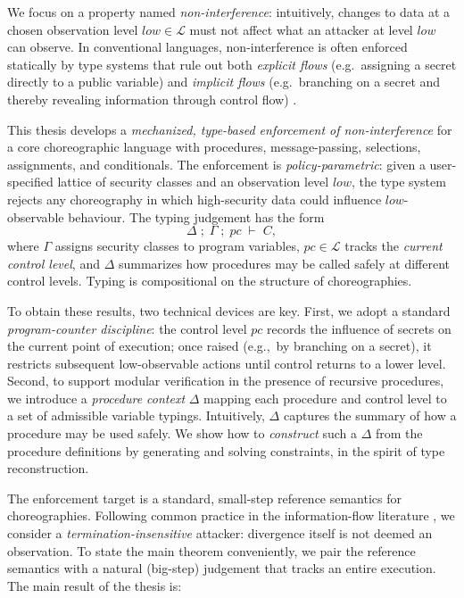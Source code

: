 \documentclass[12pt,a4paper,twoside]{book}
\newcommand{\MCL}{\mathscr{L}}
\begin{document}
We focus on a property named \emph{non-interference}\cite{goguen1982security}: intuitively, changes to data at a chosen observation level \(low \in \MCL\) must not affect what an attacker at level \(low\) can observe. In conventional languages, non-interference is often enforced statically by type systems that rule out both \emph{explicit flows} (e.g.\ assigning a secret directly to a public variable) and \emph{implicit flows} (e.g.\ branching on a secret and thereby revealing information through control flow) \cite{volpano1996sound}.

This thesis develops a \emph{mechanized, type-based enforcement of non-interference} for a core choreographic language with procedures, message-passing, selections, assignments, and conditionals. The enforcement is \emph{policy-parametric}: given a user-specified lattice of security classes and an observation level \(low\), the type system rejects any choreography in which high-security data could influence \(low\)-observable behaviour. The typing judgement has the form
\[
  \Delta \;;\; \Gamma \;;\; pc \;\vdash\; C,
\]
where $\Gamma$ assigns security classes to program variables, $pc \in \MCL$ tracks the \emph{current control level}, and $\Delta$ summarizes how procedures may be called safely at different control levels. Typing is compositional on the structure of choreographies.

To obtain these results, two technical devices are key. First, we adopt a standard \emph{program-counter discipline}: the control level $pc$ records the influence of secrets on the current point of execution; once raised (e.g.,\ by branching on a secret), it restricts subsequent low-observable actions until control returns to a lower level. Second, to support modular verification in the presence of recursive procedures, we introduce a \emph{procedure context} $\Delta$ mapping each procedure and control level to a set of admissible variable typings. Intuitively, $\Delta$ captures the summary of how a procedure may be used safely. We show how to \emph{construct} such a $\Delta$ from the procedure definitions by generating and solving constraints, in the spirit of type reconstruction\cite{pierce2002types}.

The enforcement target is a standard, small-step reference semantics for choreographies. Following common practice in the information-flow literature \cite{volpano1996sound}, we consider a \emph{termination-insensitive} attacker: divergence itself is not deemed an observation. To state the main theorem conveniently, we pair the reference semantics with a natural (big-step) judgement that tracks an entire execution. The main result of the thesis is:
\end{document}
